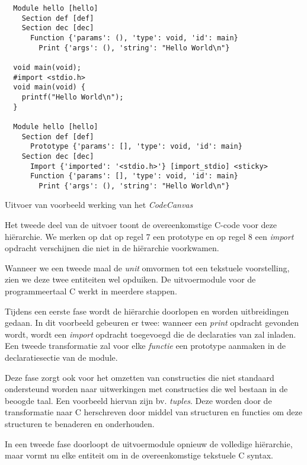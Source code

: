 \begin{listing}[ht]
  \begin{verbatim}
  Module hello [hello]
    Section def [def]
    Section dec [dec]
      Function {'params': (), 'type': void, 'id': main}
        Print {'args': (), 'string': "Hello World\n"}

  void main(void);
  #import <stdio.h>
  void main(void) {
    printf("Hello World\n");
  }
  
  Module hello [hello]
    Section def [def]
      Prototype {'params': [], 'type': void, 'id': main}
    Section dec [dec]
      Import {'imported': '<stdio.h>'} [import_stdio] <sticky>
      Function {'params': [], 'type': void, 'id': main}
        Print {'args': (), 'string': "Hello World\n"}
  \end{verbatim}
  \vspace{-5mm}
  \caption{Uitvoer van voorbeeld werking van het \emph{CodeCanvas}}
  \label{lst:codecanvas-output}
\end{listing}

Het tweede deel van de uitvoer toont de overeenkomstige C-code voor deze
hi\"erarchie. We merken op dat op regel 7 een prototype en op regel 8 een
\emph{import} opdracht verschijnen die niet in de hi\"erarchie voorkwamen.

Wanneer we een tweede maal de \emph{unit} omvormen tot een tekstuele
voorstelling, zien we deze twee entiteiten wel opduiken. De uitvoermodule voor
de programmeertaal C werkt in meerdere stappen.

Tijdens een eerste fase wordt de hi\"erarchie doorlopen en worden uitbreidingen
gedaan. In dit voorbeeld gebeuren er twee: wanneer een \emph{print} opdracht
gevonden wordt, wordt een \emph{import} opdracht toegevoegd die de declaraties
van  zal inladen. Een tweede transformatie zal voor elke
\emph{functie} een prototype aanmaken in de declaratiesectie van de module.

Deze fase zorgt ook voor het omzetten van constructies die niet standaard
ondersteund worden naar uitwerkingen met constructies die wel bestaan in de
beoogde taal. Een voorbeeld hiervan zijn bv. \emph{tuples}. Deze worden door de
transformatie naar C herschreven door middel van structuren en functies om deze
structuren te benaderen en onderhouden.

In een tweede fase doorloopt de uitvoermodule opnieuw de volledige
hi\"erarchie, maar vormt nu elke entiteit om in de overeenkomstige tekstuele C
syntax.

